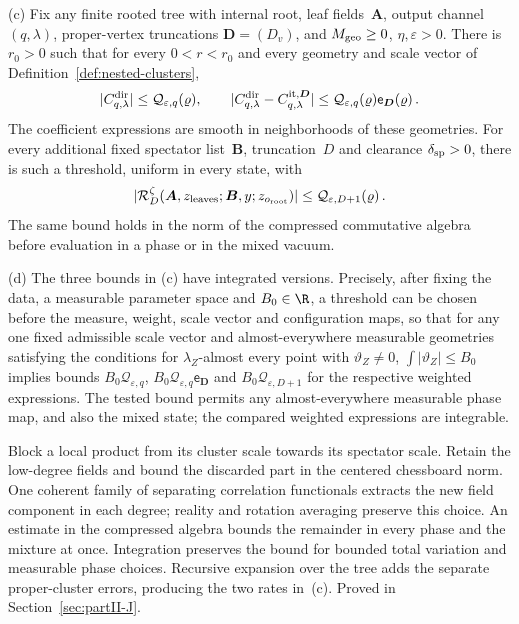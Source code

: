 \begin{proposition}
(c) Fix any finite rooted tree with internal root, leaf fields~$\boldsymbol A$, output channel~$(q,\lambda)$, proper-vertex truncations $\boldsymbol D=(D_v)$, and $M_{\rm geo}\ge0$, $\eta,\varepsilon>0$. There is $r_0>0$ such that for every $0<r<r_0$ and every geometry and scale vector of Definition~\ref{def:nested-clusters},
\begin{equation}\label{eq:P12-2}
|C^{\rm dir}_{q,\lambda}|\le \mathcal Q_{\varepsilon,q}(\varrho),\qquad
|C^{\rm dir}_{q,\lambda}-C^{\rm it,\boldsymbol D}_{q,\lambda}|\le \mathcal Q_{\varepsilon,q}(\varrho)\mathsf e_{\boldsymbol D}(\varrho)\,.
\end{equation}
The coefficient expressions are smooth in neighborhoods of these geometries. For every additional fixed spectator list~$\boldsymbol B$, truncation~$D$ and clearance $\delta_{\rm sp}>0$, there is such a threshold, uniform in every state, with
\begin{equation}\label{eq:P12-3}
|\mathcal R_D^\zeta(\boldsymbol A,z_{\rm leaves};\boldsymbol B,y;z_{o_{\rm root}})|\le \mathcal Q_{\varepsilon,D+1}(\varrho)\,.
\end{equation}
The same bound holds in the norm of the compressed commutative algebra before evaluation in a phase or in the mixed vacuum.

(d) The three bounds in (c) have integrated versions. Precisely, after fixing the data, a measurable parameter space and $B_0\in\R$, a threshold can be chosen before the measure, weight, scale vector and configuration maps, so that for any one fixed admissible scale vector and almost-everywhere measurable geometries satisfying the conditions for $\lambda_Z$-almost every point with $\vartheta_Z\ne0$, $\int|\vartheta_Z|\le B_0$ implies bounds $B_0\mathcal Q_{\varepsilon,q}$, $B_0\mathcal Q_{\varepsilon,q}\mathsf e_{\boldsymbol D}$ and $B_0\mathcal Q_{\varepsilon,D+1}$ for the respective weighted expressions. The tested bound permits any almost-everywhere measurable phase map, and also the mixed state; the compared weighted expressions are integrable.
\end{proposition}

Block a local product from its cluster scale towards its spectator scale.
Retain the low-degree fields and bound the discarded part in the centered
chessboard norm. One coherent family of separating correlation functionals
extracts the new field component in each degree; reality and rotation averaging
preserve this choice. An estimate in the compressed algebra bounds the
remainder in every phase and the mixture at once. Integration preserves the
bound for bounded total variation and measurable phase choices. Recursive
expansion over the tree adds the separate proper-cluster errors, producing
the two rates in~\textup{(c)}. Proved in Section~\ref{sec:partII-J}.

